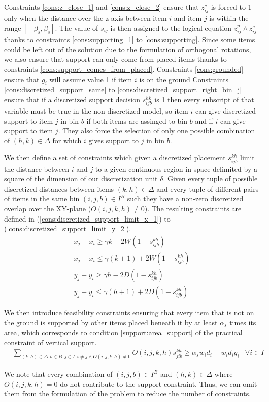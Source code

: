 Constraints \ref{cons:z_close_1} and \ref{cons:z_close_2} ensure that $z^c_{ij}$ is forced to 1 only when the distance over the z-axis between item $i$ and item $j$ is within the range $[-\beta_s, \beta_s]$.
The value of $s_{ij}$ is then assigned to the logical equation $z^p_{ij} \land z^c_{ij}$ thanks to constraints \ref{cons:supporting_1} to \ref{cons:supporting}.
Since some items could be left out of the solution due to the formulation of orthogonal rotations, we also ensure that support can only come from placed items thanks to constraints \ref{cons:support_comes_from_placed}.
Constraints \ref{cons:grounded} ensure that $g_i$ will assume value 1 if item $i$ is on the ground
Constraints \ref{cons:discretized_support_same} to \ref{cons:discretized_support_right_bin_j} ensure that if a discretized support decision $s_{ijb}^{hk}$ is 1 then every subscript of that variable must be true in the non-discretized model, so item $i$ can give discretized support to item $j$ in bin $b$ if both items are assinged to bin $b$ and if $i$ can give support to item $j$. They also force the selection of only one possible combination of $(h,k) \in \Delta$ for which $i$ gives support to $j$ in bin $b$.

We then define a set of constraints which given a discretized placement $s^{k h}_{i j b}$ limit the distance between $i$ and $j$ to a given continuous region in space delimited by a square of the dimension of our discretization unit $\delta$.
Given every tuple of possible discretized distances between items $ (k, h) \in \Delta$ and every tuple of different pairs of items in the same bin $(i, j, b) \in I^B$ such they have a non-zero discretized overlap over the XY-plane ($O(i, j, k, h) \neq 0$).
The resulting constraints are defined in (\ref{cons:discretized_support_limit_x_1}) to (\ref{cons:discretized_support_limit_y_2}).
\begin{align}
    & x_j - x_i \ge \gamma k - 2W( 1 - s^{k h}_{i j b}) &  \label{cons:discretized_support_limit_x_1} \\
    & x_j - x_i \le \gamma (k + 1) + 2W( 1 - s^{k h}_{i j b}) &  \label{cons:discretized_support_limit_x_2} \\
    & y_j - y_i \ge \gamma h - 2D( 1 - s^{k h}_{i j b}) &  \label{cons:discretized_support_limit_y_1} \\
    & y_j - y_i \le \gamma (h + 1) + 2D( 1 - s^{k h}_{i j b}) &  \label{cons:discretized_support_limit_y_2}
\end{align}

We then introduce feasibility constraints ensuring that every item that is not on the ground is supported by other items placed beneath it by at least $\alpha_s$ times its area, which corresponds to condition \ref{support:area_support} of the practical constraint of vertical support.
\begin{eqnarray}
    & \sum\limits_{(k, h) \in \Delta, b \in B, j \in I : i \neq j \land O(i, j, k, h) \neq 0}{ O(i, j, k, h)s^{k h}_{j i b}} \ge \alpha_s w_i d_i - w_i d_i g_i & \forall i \in I \label{cons:every_item_is_supported}
\end{eqnarray}

We note that every combination of $(i,j,b) \in I^B$ and $(h,k) \in \Delta$ where $O(i, j, k, h) = 0$ do not contribute to the support constraint. Thus, we can omit them from the formulation of the problem to reduce the number of constraints.